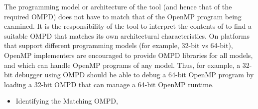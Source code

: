 The programming model or architecture of the tool (and hence that of the 
required OMPD) does not have to match that of the OpenMP program being 
examined. It is the responsibility of the tool to interpret the contents
of  to find a suitable OMPD that matches its own 
architectural characteristics. On platforms that support different programming 
models (for example, 32-bit vs 64-bit), OpenMP implementers are encouraged
to provide OMPD libraries for all models, and which can handle OpenMP 
programs of any model. Thus, for example, a 32-bit debugger using OMPD 
should be able to debug a 64-bit OpenMP program by loading a 32-bit OMPD 
that can manage a 64-bit OpenMP runtime.

\crossreferences
\begin{itemize}
	\item Identifying the Matching OMPD, 
\end{itemize}



